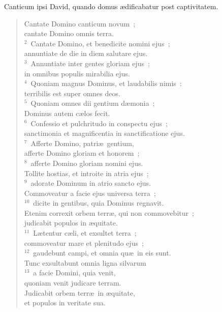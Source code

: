 \bchapter
\lettrine[lines=3,image=true,loversize=0.05,lraise=-0.03]{C}{}anticum ipsi David, quando domus \ae dificabatur post captivitatem. \begin{flushleft}\begin{verse}\vspace{6pt}Cantate Domino canticum novum~;\\ cantate Domino omnis terra.\\
${}^{2}$~Cantate Domino, et benedicite nomini ejus~;\\ annuntiate de die in diem salutare ejus.\\
${}^{3}$~Annuntiate inter gentes gloriam ejus~;\\ in omnibus populis mirabilia ejus.\\
${}^{4}$~Quoniam magnus Dominus, et laudabilis nimis~:\\ terribilis est super omnes deos.\\
${}^{5}$~Quoniam omnes dii gentium d\ae monia~;\\ Dominus autem c\ae los fecit.\\
${}^{6}$~Confessio et pulchritudo in conspectu ejus~;\\ sanctimonia et magnificentia in sanctificatione ejus.\\
${}^{7}$~Afferte Domino, patri\ae\ gentium,\\ afferte Domino gloriam et honorem~;\\
${}^{8}$~afferte Domino gloriam nomini ejus.\\ Tollite hostias, et introite in atria ejus~;\\
${}^{9}$~adorate Dominum in atrio sancto ejus.\\ Commoveatur a facie ejus universa terra~;\\
${}^{10}$~dicite in gentibus, quia Dominus regnavit.\\ Etenim correxit orbem terr\ae , qui non commovebitur~;\\ judicabit populos in \ae quitate.\\
${}^{11}$~L\ae tentur c\ae li, et exsultet terra~;\\ commoveatur mare et plenitudo ejus~;\\
${}^{12}$~gaudebunt campi, et omnia qu\ae\ in eis sunt.\\ Tunc exsultabunt omnia ligna silvarum\\
${}^{13}$~a facie Domini, quia venit,\\ quoniam venit judicare terram.\\ Judicabit orbem terr\ae\ in \ae quitate,\\ et populos in veritate sua.\end{verse}\end{flushleft}



